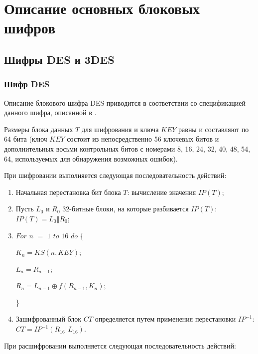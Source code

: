 \documentclass{./civarticle}
\begin{document}
\section{Описание основных блоковых шифров}

\subsection{Шифры DES и 3DES}

\subsubsection{Шифр DES}

Описание блокового шифра DES приводится в соответствии со спецификацией данного шифра, описанной в \cite{des}.

Размеры блока данных $T$ для шифрования и ключа $KEY$ равны и составляют по 64 бита (ключ $KEY$ состоит из непосредственно 56 ключевых битов и дополнительных восьми контрольных битов с номерами 8, 16, 24, 32, 40, 48, 54, 64, используемых для обнаружения возможных ошибок).

При шифровании выполняется следующая последовательность действий:
\begin{enumerate}
    \item Начальная перестановка бит блока $T$: вычисление значения $IP(T)$;
    \item Пусть $L_0$ и $R_0$ 32-битные блоки, на которые разбивается $IP(T)$: $IP(T) = L_0 \mathbin\Vert R_0$;
    \item $For$ $n$ $=$ $1$ $to$ $16$ $do$ \{ 

    \hspace{0.5cm} $K_n = KS(n, KEY)$;
    
    \hspace{0.5cm} $L_n = R_{n-1}$;

    \hspace{0.5cm} $R_n = L_{n-1} \oplus f(R_{n-1}, K_n)$;
    
\}
    \item Зашифрованный блок $CT$ определяется путем применения перестановки $IP^{-1}$: $CT = IP^{-1}(R_{16} \mathbin\Vert L_{16})$.
\end{enumerate}

При расшифровании выполняется следующая последовательность действий:
\end{document}
